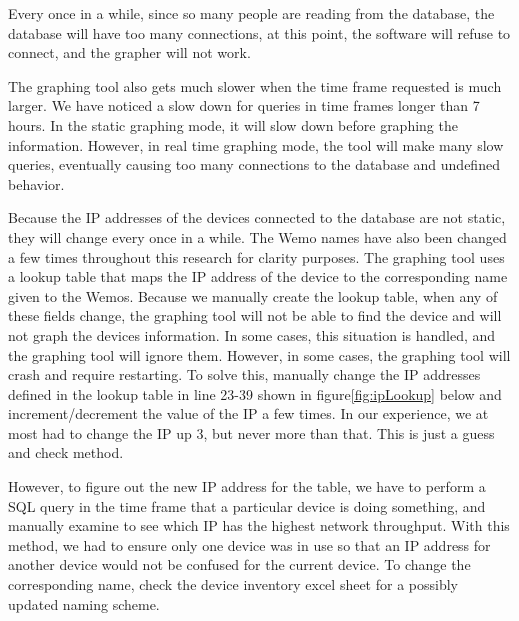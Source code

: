 Every once in a while, since so many people are reading from the database, the database will have too many connections, at this point, the software will refuse to connect, and the grapher will not work.

The graphing tool also gets much slower when the time frame requested is much larger. We have noticed a slow down for queries in time frames longer than 7 hours. In the static graphing mode, it will slow down before graphing the information. However, in real time graphing mode, the tool will make many slow queries, eventually causing too many connections to the database and undefined behavior.

Because the IP addresses of the devices connected to the database are not static, they will change every once in a while. The Wemo names have also been changed a few times throughout this research for clarity purposes. The graphing tool uses a lookup table that maps the IP address of the device to the corresponding name given to the Wemos. Because we manually create the lookup table, when any of these fields change, the graphing tool will not be able to find the device and will not graph the devices information. In some cases, this situation is handled, and the graphing tool will ignore them. However, in some cases, the graphing tool will crash and require restarting. To solve this, manually change the IP addresses defined in the lookup table in line 23-39 shown in figure\ref{fig:ipLookup} below and increment/decrement the value of the IP a few times. In our experience, we at most had to change the IP up 3, but never more than that. This is just a guess and check method.

However, to figure out the new IP address for the table, we have to perform a SQL query in the time frame that a particular device is doing something, and manually examine to see which IP has the highest network throughput. With this method, we had to ensure only one device was in use so that an IP address for another device would not be confused for the current device. To change the corresponding name, check the device inventory excel sheet for a possibly updated naming scheme.

